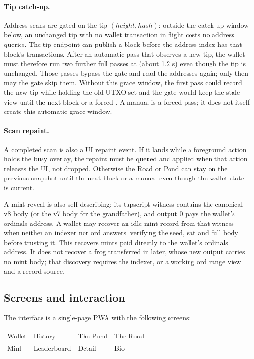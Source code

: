 \paragraph{Tip catch-up.} Address scans are gated on the tip
$(\mathit{height},\mathit{hash})$: outside the catch-up window below, an
unchanged tip with no wallet transaction in flight costs no address queries.
The tip endpoint can publish a block before the address index has that
block's transactions. After an automatic pass that observes a new tip, the
wallet must therefore run two further full passes at
 (about 1.2 s) even though the tip is unchanged. Those
passes bypass the gate and read the addresses again; only then may the gate
skip them. Without this grace window, the first pass could record the new tip
while holding the old UTXO set and the gate would keep the stale view until
the next block or a forced . A manual  is a forced
pass; it does not itself create this automatic grace window.

\paragraph{Scan repaint.} A completed scan is also a UI repaint event. If it
lands while a foreground action holds the busy overlay, the repaint must be
queued and applied when that action releases the UI, not dropped. Otherwise
the Road or Pond can stay on the previous snapshot until the next block or a
manual  even though the wallet state is current.

A mint reveal is also self-describing: its tapscript witness contains the
canonical v8 body (or the v7 body for the grandfather), and output 0 pays the
wallet's ordinals address. A wallet
may recover an idle mint record from that witness when neither an indexer
nor ord answers, verifying the seed, sat and full body before trusting it.
This recovers mints paid directly to the wallet's ordinals address. It does
not recover a frog transferred in later, whose new output carries no mint
body; that discovery requires the indexer, or a working ord range view and a
record source.

\subsection{Screens and interaction}

The interface is a single-page PWA with the following screens:

\begin{center}
\small
\begin{tabular}{@{}llll@{}}
\toprule
Wallet & History & The Pond & The Road \\
Mint & Leaderboard & Detail & Bio \\
\bottomrule
\end{tabular}
\end{center}

